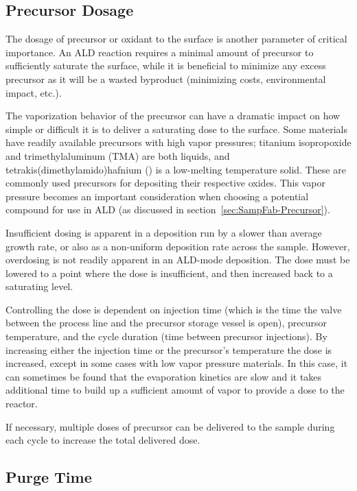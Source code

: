 
\subsection{Precursor Dosage}

The dosage of precursor or oxidant to the surface is another parameter of critical importance. An ALD reaction requires a minimal amount of precursor to sufficiently saturate the surface, while it is beneficial to minimize any excess precursor as it will be a wasted byproduct (minimizing costs, environmental impact, etc.). 

The vaporization behavior of the precursor can have a dramatic impact on how simple or difficult it is to deliver a saturating dose to the surface. Some materials have readily available precursors with high vapor pressures; titanium isopropoxide and trimethylaluminum (TMA) are both liquids, and tetrakis(dimethylamido)hafnium () is a low-melting temperature solid. These are commonly used precursors for depositing their respective oxides. This vapor pressure becomes an important consideration when choosing a potential compound for use in ALD (as discussed in section~\vref{sec:SampFab-Precursor}).

Insufficient dosing is apparent in a deposition run by a slower than average growth rate, or also as a non-uniform deposition rate across the sample. However, overdosing is not readily apparent in an ALD-mode deposition. The dose must be lowered to a point where the dose is insufficient, and then increased back to a saturating level. 

Controlling the dose is dependent on injection time (which is the time the valve between the process line and the precursor storage vessel is open), precursor temperature, and the cycle duration (time between precursor injections). By increasing either the injection time or the precursor's temperature the dose is increased, except in some cases with low vapor pressure materials. In this case, it can sometimes be found that the evaporation kinetics are slow and it takes additional time to build up a sufficient amount of vapor to provide a dose to the reactor. 

If necessary, multiple doses of precursor can be delivered to the sample during each cycle to increase the total delivered dose.


\subsection{Purge Time}


